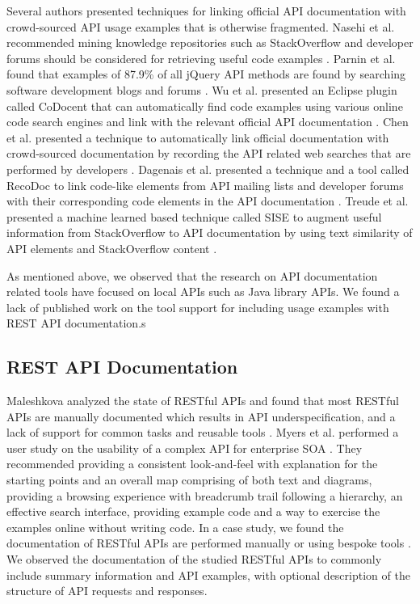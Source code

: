 \documentclass[10pt, conference]{IEEEtran}
\begin{document}
Several authors presented techniques for linking official API documentation with crowd-sourced API usage examples that is otherwise fragmented. Nasehi et al. recommended mining knowledge repositories such as StackOverflow and developer forums should be considered for retrieving useful code examples \cite{Nasehi_what_makes}. Parnin et al. found that examples of 87.9\% of all jQuery API methods are found by searching software development blogs and forums \cite{Parnin_measuring}. Wu et al. presented an Eclipse plugin called CoDocent that can automatically find code examples using various online code search engines and link with the relevant official API documentation \cite{wu2010codocent}. Chen et al. presented a technique to automatically link official documentation with crowd-sourced documentation by recording the API related web searches that are performed by developers \cite{Chen_who_asked}. Dagenais et al. presented a technique and a tool called RecoDoc to link code-like elements from API mailing lists and developer forums with their corresponding code elements in the API documentation \cite{dagenais2012recovering}. Treude et al. presented a machine learned based technique called SISE to augment useful information from StackOverflow to API documentation by using text similarity of API elements and StackOverflow content \cite{Treude:2016:AAD:2884781.2884800}.

As mentioned above, we observed that the research on API documentation related tools have focused on local APIs such as Java library APIs. We found a lack of published work on the tool support for including usage examples with REST API documentation.s

\subsection{REST API Documentation} %
Maleshkova analyzed the state of RESTful APIs and found that most RESTful APIs are manually documented which results in API underspecification, and a lack of support for common tasks and reusable tools \cite{Maleshkova_investigating}. Myers et al. performed a user study on the usability of a complex API for enterprise SOA \cite{Myers_study}. They recommended providing a consistent look-and-feel with explanation for the starting points and an overall map comprising of both text and diagrams, providing a browsing experience with breadcrumb trail following a hierarchy, an effective search interface, providing example code and a way to exercise the examples online without writing code. In a case study, we found the documentation of RESTful APIs are performed manually or using bespoke tools \cite{sohan2015case}. We observed the documentation of the studied RESTful APIs to commonly include summary information and API examples, with optional description of the structure of API requests and responses.
\end{document}
